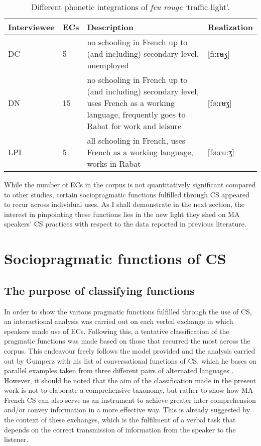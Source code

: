 \documentclass[output=paper]{langscibook}
\begin{document}
\begin{table}
	\begin{tabularx}{\textwidth}{llQl}
		\midrule\toprule
		\textbf{Interviewee} & \textbf{\glspl*{EC}} & \textbf{Description} & \textbf{Realization} \\\midrule
		DC & 5 & no schooling in French up to (and including) secondary level, unemployed & [fi:rʉʒ] \\
		DN & 15 & no schooling in French up to (and including) secondary level, uses French as a working language, frequently goes to Rabat for work and leisure & [fø:rʉʒ] \\
		LPI & 5 & all schooling in French, uses French as a working language, works in Rabat & [fø:ru:ʒ]\\ \bottomrule\midrule
	\end{tabularx}
	\caption{Different phonetic integrations of \textit{feu rouge} ‘traffic light’.}
	\label{falchetta:tab:3}
\end{table}


\noindent
While the number of \glspl*{EC} in the corpus is not quantitatively significant compared to other studies, certain sociopragmatic functions fulfilled through \gls*{CS} appeared to recur across individual uses. As I shall demonstrate in the next section, the interest in pinpointing these functions lies in the new light they shed on \gls*{MA} speakers’ \gls*{CS} practices with respect to the data reported in previous literature.

\section{Sociopragmatic functions of \gls*{CS}}
\subsection{The purpose of classifying functions}
In order to show the various pragmatic functions fulfilled through the use of \gls*{CS}, an interactional analysis was carried out on each verbal exchange in which speakers made use of \glspl*{EC}. Following this, a tentative classification of the pragmatic functions was made based on those that recurred the most across the corpus. This endeavour freely follows the model provided and the analysis carried out by Gumperz %
with his list of conversational functions of \gls*{CS}, which he bases on parallel examples taken from three different pairs of alternated languages \citep[75--84]{gumperz_discourse_1982}. However, it should be noted that the aim of the classification made in the present work is not to elaborate a comprehensive taxonomy, but rather to show how \gls*{MA}-French \gls*{CS} can also serve as an instrument to achieve greater inter-comprehension and/or convey information in a more effective way. This is already suggested by the context of these exchanges, which is the fulfilment of a verbal task that depends on the correct transmission of information from the speaker to the listener.
\end{document}
